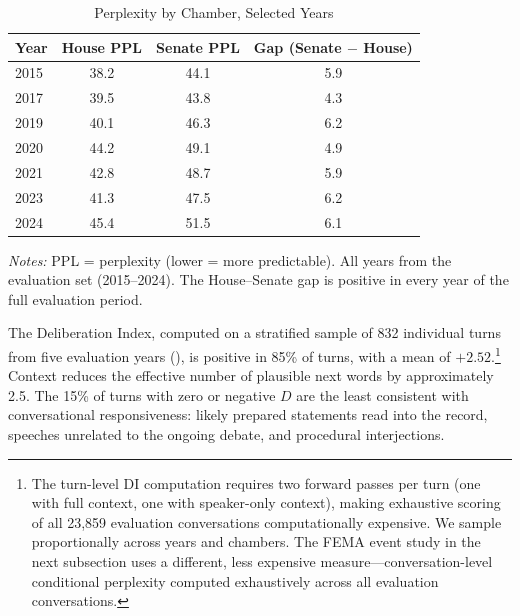 \documentclass[12pt]{article}
\newcommand{\DI}{\mathit{D}}
\begin{document}
\begin{table}[H]
\centering
\caption{Perplexity by Chamber, Selected Years}
\label{tab:perplexity}
\begin{threeparttable}
\begin{tabular}{lccc}
\toprule
Year & House PPL & Senate PPL & Gap (Senate $-$ House) \\
\midrule
2015 & 38.2 & 44.1 & 5.9 \\
2017 & 39.5 & 43.8 & 4.3 \\
2019 & 40.1 & 46.3 & 6.2 \\
2020 & 44.2 & 49.1 & 4.9 \\
2021 & 42.8 & 48.7 & 5.9 \\
2023 & 41.3 & 47.5 & 6.2 \\
2024 & 45.4 & 51.5 & 6.1 \\
\bottomrule
\end{tabular}
\begin{tablenotes}[flushleft]
\small
\item \textit{Notes:} PPL = perplexity (lower = more predictable). All years from the evaluation set (2015--2024). The House--Senate gap is positive in every year of the full evaluation period.
\end{tablenotes}
\end{threeparttable}
\end{table}

The Deliberation Index, computed on a stratified sample of 832 individual turns from five evaluation years (), is positive in 85\% of turns, with a mean of $+2.52$.\footnote{The turn-level DI computation requires two forward passes per turn (one with full context, one with speaker-only context), making exhaustive scoring of all 23,859 evaluation conversations computationally expensive. We sample proportionally across years and chambers. The FEMA event study in the next subsection uses a different, less expensive measure---conversation-level conditional perplexity computed exhaustively across all evaluation conversations.} Context reduces the effective number of plausible next words by approximately 2.5. The 15\% of turns with zero or negative $\DI$ are the least consistent with conversational responsiveness: likely prepared statements read into the record, speeches unrelated to the ongoing debate, and procedural interjections.
\end{document}
